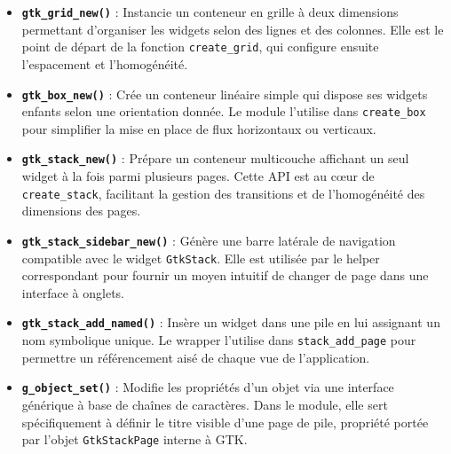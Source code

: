 \begin{itemize}
    \item \textbf{\texttt{gtk\_grid\_new()}} : Instancie un conteneur en grille à deux dimensions permettant d'organiser les widgets selon des lignes et des colonnes. Elle est le point de départ de la fonction \texttt{create\_grid}, qui configure ensuite l'espacement et l'homogénéité.
    \item \textbf{\texttt{gtk\_box\_new()}} : Crée un conteneur linéaire simple qui dispose ses widgets enfants selon une orientation donnée. Le module l'utilise dans \texttt{create\_box} pour simplifier la mise en place de flux horizontaux ou verticaux.
    \item \textbf{\texttt{gtk\_stack\_new()}} : Prépare un conteneur multicouche affichant un seul widget à la fois parmi plusieurs pages. Cette API est au cœur de \texttt{create\_stack}, facilitant la gestion des transitions et de l'homogénéité des dimensions des pages.
    \item \textbf{\texttt{gtk\_stack\_sidebar\_new()}} : Génère une barre latérale de navigation compatible avec le widget \texttt{GtkStack}. Elle est utilisée par le helper correspondant pour fournir un moyen intuitif de changer de page dans une interface à onglets.
    \item \textbf{\texttt{gtk\_stack\_add\_named()}} : Insère un widget dans une pile en lui assignant un nom symbolique unique. Le wrapper l'utilise dans \texttt{stack\_add\_page} pour permettre un référencement aisé de chaque vue de l'application.
    \item \textbf{\texttt{g\_object\_set()}} : Modifie les propriétés d'un objet via une interface générique à base de chaînes de caractères. Dans le module, elle sert spécifiquement à définir le titre visible d'une page de pile, propriété portée par l'objet \texttt{GtkStackPage} interne à GTK.
\end{itemize}

\newpage
